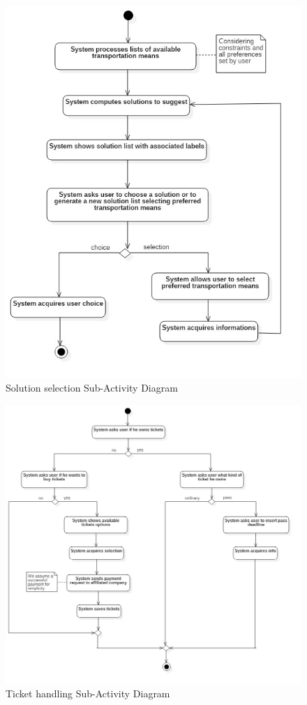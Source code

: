 		\begin{figure}[H]
			\centerline{\includegraphics[height=0.35\paperheight]{Images/SolutionSelectionAD}}
			\caption{Solution selection Sub-Activity Diagram}
		\end{figure}
		\begin{figure}[H]
			\centerline{\includegraphics[height=0.35\paperheight]{Images/TicketHandlingAD}}
			\caption{Ticket handling Sub-Activity Diagram}
		\end{figure}

